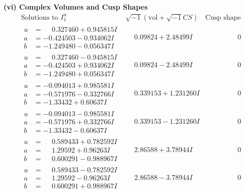 \documentclass[1p]{elsarticle_modified}
\theoremstyle{definition}
\newcommand{\I}{\sqrt{-1}}
\begin{document}
\newpage\flushleft \textbf{(vi) Complex Volumes and Cusp Shapes}
$$\begin{array}{c|c|c}  
\text{Solutions to }I^u_{1}& \I (\text{vol} + \sqrt{-1}CS) & \text{Cusp shape}\\
 \hline 
\begin{aligned}
u &= \phantom{-}0.327460 + 0.945815 I \\
a &= -0.424503 - 0.934062 I \\
b &= -1.249480 - 0.056347 I\end{aligned}
 & \phantom{-}0.09824 + 2.48499 I & \phantom{-0.000000 } 0 \\ \hline\begin{aligned}
u &= \phantom{-}0.327460 - 0.945815 I \\
a &= -0.424503 + 0.934062 I \\
b &= -1.249480 + 0.056347 I\end{aligned}
 & \phantom{-}0.09824 - 2.48499 I & \phantom{-0.000000 } 0 \\ \hline\begin{aligned}
u &= -0.094013 + 0.985581 I \\
a &= -0.571976 - 0.332766 I \\
b &= -1.33432 + 0.60637 I\end{aligned}
 & \phantom{-}0.339153 + 1.231260 I & \phantom{-0.000000 } 0 \\ \hline\begin{aligned}
u &= -0.094013 - 0.985581 I \\
a &= -0.571976 + 0.332766 I \\
b &= -1.33432 - 0.60637 I\end{aligned}
 & \phantom{-}0.339153 - 1.231260 I & \phantom{-0.000000 } 0 \\ \hline\begin{aligned}
u &= \phantom{-}0.589433 + 0.782592 I \\
a &= \phantom{-}1.29592 + 0.96263 I \\
b &= \phantom{-}0.600291 - 0.988967 I\end{aligned}
 & \phantom{-}2.86588 + 3.78944 I & \phantom{-0.000000 } 0 \\ \hline\begin{aligned}
u &= \phantom{-}0.589433 - 0.782592 I \\
a &= \phantom{-}1.29592 - 0.96263 I \\
b &= \phantom{-}0.600291 + 0.988967 I\end{aligned}
 & \phantom{-}2.86588 - 3.78944 I & \phantom{-0.000000 } 0 \\ \hline\begin{aligned}

\end{aligned}
\end{array}$$
\end{document}
